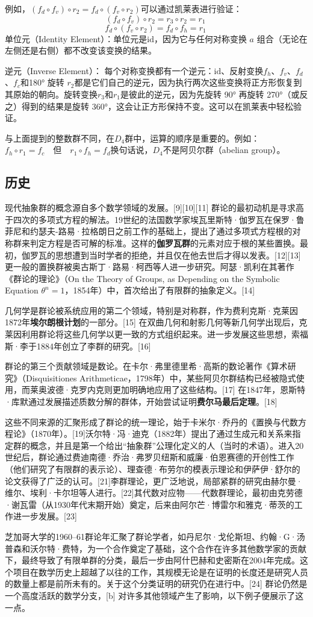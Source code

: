 例如，\((f_d \circ f_v) \circ r_2 = f_d \circ (f_v \circ r_2)\)可以通过凯莱表进行验证：  
\[
(f_d \circ f_v) \circ r_2 = r_3 \circ r_2 = r_1~
\]
\[
f_d \circ (f_v \circ r_2) = f_d \circ f_h = r_1~
\]  
单位元（Identity Element）：单位元是\( \text{id} \)，因为它与任何对称变换 \( a \) 组合（无论在左侧还是右侧）都不改变该变换的结果。

逆元（Inverse Element）： 每个对称变换都有一个逆元：\( \text{id} \)、反射变换\( f_h \)、\( f_v \)、\( f_d \)、\( f_c \)和180° 旋转 \( r_2 \)都是它们自己的逆元，因为执行两次这些变换将正方形恢复到其原始的朝向。旋转变换\( r_3 \)和\( r_1 \)是彼此的逆元，因为先旋转 90° 再旋转 270°（或反之）得到的结果是旋转 360°，这会让正方形保持不变。这可以在凯莱表中轻松验证。

与上面提到的整数群不同，在\( D_4 \)群中，运算的顺序是重要的。例如：\(
f_h \circ r_1 = f_c \quad \text{但} \quad r_1 \circ f_h = f_d\)换句话说，\( D_4 \)不是阿贝尔群（abelian group）。
\subsection{历史}  
现代抽象群的概念源自多个数学领域的发展。[9][10][11] 群论的最初动机是寻求高于四次的多项式方程的解法。19世纪的法国数学家埃瓦里斯特·伽罗瓦在保罗·鲁菲尼和约瑟夫-路易·拉格朗日之前工作的基础上，提出了通过多项式方程根的对称群来判定方程是否可解的标准。这样的\textbf{伽罗瓦群}的元素对应于根的某些置换。最初，伽罗瓦的思想遭到当时学者的拒绝，并且仅在他去世后才得以发表。[12][13] 更一般的置换群被奥古斯丁·路易·柯西等人进一步研究。阿瑟·凯利在其著作《群论的理论》（On the Theory of Groups, as Depending on the Symbolic Equation \( \theta^n = 1 \)，1854年）中，首次给出了有限群的抽象定义。[14]

几何学是群论被系统应用的第二个领域，特别是对称群，作为费利克斯·克莱因1872年\textbf{埃尔朗根计划}的一部分。[15] 在双曲几何和射影几何等新几何学出现后，克莱因利用群论将这些几何学以更一致的方式组织起来。进一步发展这些思想，索福斯·李于1884年创立了李群的研究。[16]

群论的第三个贡献领域是数论。在卡尔·弗里德里希·高斯的数论著作《算术研究》（Disquisitiones Arithmeticae，1798年）中，某些阿贝尔群结构已经被隐式使用，而莱奥波德·克罗内克则更加明确地应用了这些结构。[17] 在1847年，恩斯特·库默通过发展描述质数分解的群体，开始尝试证明\textbf{费尔马最后定理}。[18]

这些不同来源的汇聚形成了群论的统一理论，始于卡米尔·乔丹的《置换与代数方程论》（1870年）。[19]沃尔特·冯·迪克（1882年）提出了通过生成元和关系来指定群的概念，并且是第一个给出“抽象群”公理化定义的人（当时的术语）。进入20世纪后，群论通过费迪南德·乔治·弗罗贝纽斯和威廉·伯恩赛德的开创性工作（他们研究了有限群的表示论）、理查德·布劳尔的模表示理论和伊萨伊·舒尔的论文获得了广泛的认可。[21]李群理论，更广泛地说，局部紧群的研究由赫尔曼·维尔、埃利·卡尔坦等人进行。[22]其代数对应物——代数群理论，最初由克劳德·谢瓦雷（从1930年代末期开始）奠定，后来由阿尔芒·博雷尔和雅克·蒂茨的工作进一步发展。[23]

芝加哥大学的1960–61群论年汇聚了群论学者，如丹尼尔·戈伦斯坦、约翰·G·汤普森和沃尔特·费特，为一个合作奠定了基础，这个合作在许多其他数学家的贡献下，最终导致了有限单群的分类，最后一步由阿什巴赫和史密斯在2004年完成。这个项目在数学历史上超越了以往的工作，其规模无论是在证明的长度还是研究人员的数量上都是前所未有的。关于这个分类证明的研究仍在进行中。[24] 群论仍然是一个高度活跃的数学分支，[b] 对许多其他领域产生了影响，以下例子便展示了这一点。

